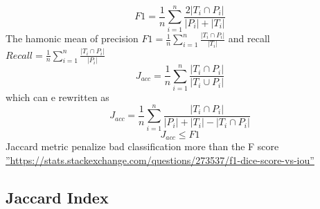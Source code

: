 \documentclass[10pt]{article}
\begin{document}
\paragraph{}
 $$F1 =\frac{1}{n}\sum_{i=1}^{n} \frac{2|{T_i}\cap{P_i}|}{|P_i|+|T_i|}$$
 The hamonic mean of precision $F1 =\frac{1}{n}\sum_{i=1}^{n} \frac{|{T_i}\cap{P_i}|}{|T_i|}$ and recall$Recall =\frac{1}{n}\sum_{i=1}^{n} \frac{|{T_i}\cap{P_i}|}{|P_i|}$
 $$J_{acc} =\frac{1}{n}\sum_{i=1}^{n} \frac{|{T_i}\cap{P_i}|}{|{T_i}\cup{P_i}|}$$
 which can e rewritten as
 $$J_{acc} =\frac{1}{n}\sum_{i=1}^{n} \frac{|{T_i}\cap{P_i}|}{|P_i|+|T_i|-|{T_i}\cap{P_i}|}$$
 $$J_{acc}\leq{F1}$$
Jaccard metric penalize bad classification more than the F score \hyperref[besteval]{''https://stats.stackexchange.com/questions/273537/f1-dice-score-vs-iou''}


\subsection{Jaccard Index}
   
\end{document}
